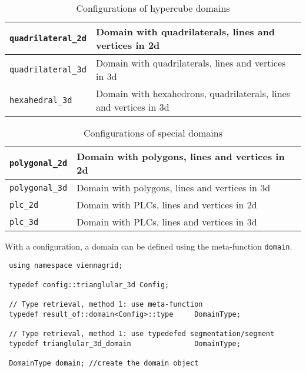 \begin{table}[tb]
  \begin{center}
    \begin{tabular}{|l|l|}
      \hline
      \lstinline|quadrilateral_2d|   &  Domain with quadrilaterals, lines and vertices in 2d  \\
      \hline
      \lstinline|quadrilateral_3d|   &  Domain with quadrilaterals, lines and vertices in 3d  \\
      \hline
      \lstinline|hexahedral_3d|   &  Domain with hexahedrons, quadrilaterals, lines and vertices in 3d  \\
      \hline 
    \end{tabular}
    \caption{Configurations of hypercube domains}
    \label{tab:configs-hypercube}
  \end{center}
\end{table}


\begin{table}[tb]
  \begin{center}
    \begin{tabular}{|l|l|}
      \hline
      \lstinline|polygonal_2d|   &  Domain with polygons, lines and vertices in 2d  \\
      \hline
      \lstinline|polygonal_3d|   &  Domain with polygons, lines and vertices in 3d  \\
      \hline
      \lstinline|plc_2d|   &  Domain with PLCs, lines and vertices in 2d  \\
      \hline 
      \lstinline|plc_3d|   &  Domain with PLCs, lines and vertices in 3d  \\
      \hline 
    \end{tabular}
    \caption{Configurations of special domains}
    \label{tab:configs-special}
  \end{center}
\end{table}

\pagebreak

With a configuration, a domain can be defined using the meta-function \lstinline|domain|.

\begin{lstlisting}
 using namespace viennagrid;

 typedef config::trianglular_3d Config;
 
 // Type retrieval, method 1: use meta-function
 typedef result_of::domain<Config>::type     DomainType;
 
 // Type retrieval, method 1: use typedefed segmentation/segment
 typedef trianglular_3d_domain               DomainType;

 DomainType domain; //create the domain object
\end{lstlisting}

